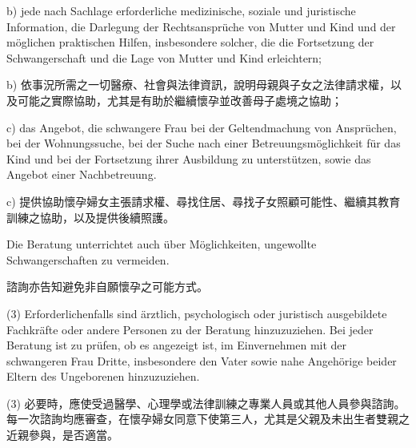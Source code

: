 \documentclass[12pt]{article}
\begin{document}
\begin{sourcepara}[title={原文主文 II.3(2)b}]
b) jede nach Sachlage erforderliche medizinische, soziale und juristische Information, die Darlegung der Rechtsansprüche von Mutter und Kind und der möglichen praktischen Hilfen, insbesondere solcher, die die Fortsetzung der Schwangerschaft und die Lage von Mutter und Kind erleichtern;
\end{sourcepara}
\begin{transpara}
b) 依事況所需之一切醫療、社會與法律資訊，說明母親與子女之法律請求權，以及可能之實際協助，尤其是有助於繼續懷孕並改善母子處境之協助；
\end{transpara}

\begin{sourcepara}[title={原文主文 II.3(2)c}]
c) das Angebot, die schwangere Frau bei der Geltendmachung von Ansprüchen, bei der Wohnungssuche, bei der Suche nach einer Betreuungsmöglichkeit für das Kind und bei der Fortsetzung ihrer Ausbildung zu unterstützen, sowie das Angebot einer Nachbetreuung.
\end{sourcepara}
\begin{transpara}
c) 提供協助懷孕婦女主張請求權、尋找住居、尋找子女照顧可能性、繼續其教育訓練之協助，以及提供後續照護。
\end{transpara}

\begin{sourcepara}[title={原文主文 II.3 避孕資訊}]
Die Beratung unterrichtet auch über Möglichkeiten, ungewollte Schwangerschaften zu vermeiden.
\end{sourcepara}
\begin{transpara}
諮詢亦告知避免非自願懷孕之可能方式。
\end{transpara}

\begin{sourcepara}[title={原文主文 II.3(3)}]
(3) Erforderlichenfalls sind ärztlich, psychologisch oder juristisch ausgebildete Fachkräfte oder andere Personen zu der Beratung hinzuzuziehen. Bei jeder Beratung ist zu prüfen, ob es angezeigt ist, im Einvernehmen mit der schwangeren Frau Dritte, insbesondere den Vater sowie nahe Angehörige beider Eltern des Ungeborenen hinzuzuziehen.
\end{sourcepara}
\begin{transpara}
(3) 必要時，應使受過醫學、心理學或法律訓練之專業人員或其他人員參與諮詢。每一次諮詢均應審查，在懷孕婦女同意下使第三人，尤其是父親及未出生者雙親之近親參與，是否適當。
\end{transpara}
\end{document}

